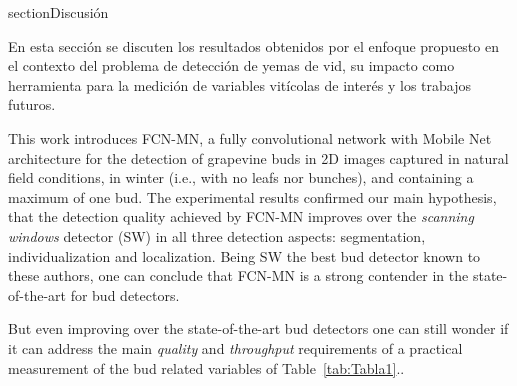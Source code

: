 \documentclass[a4paper,authoryear,review]{elsarticle}
\begin{document}

section{Discusión} \label{sec:discussion}

En esta sección se discuten los resultados obtenidos por el enfoque propuesto en el contexto del problema de detección de yemas de vid, su impacto como herramienta para la medición de variables vitícolas de interés y los trabajos futuros. 


This work introduces FCN-MN, a fully convolutional network with Mobile Net architecture \cite{REF}  for the detection of grapevine buds in 2D images captured in natural field conditions, in winter (i.e., with no leafs nor bunches), and containing a maximum of one bud.
%
The experimental results confirmed our main hypothesis, that the detection quality achieved by FCN-MN improves over the \emph{scanning windows} detector (SW) \cite{REF}  in all three detection aspects: segmentation, individualization and localization. Being SW the best bud detector known to these authors, one can conclude that FCN-MN is a strong contender in the state-of-the-art for bud detectors.




But even improving over the state-of-the-art bud detectors one can still wonder if it can address the main \emph{quality} and \emph{throughput} requirements of a practical measurement of the bud related variables of Table~\ref{tab:Tabla1}.. 
\end{document}
